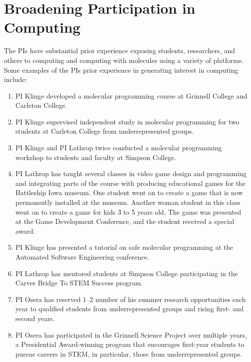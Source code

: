 \section{Broadening Participation in Computing}

The PIs have substantial prior experience exposing students, researchers, and others to computing and computing with molecules using a variety of platforms.  Some examples of the PIs prior experience in generating interest in computing include:
\begin{enumerate}
    \item PI Klinge developed a molecular programming course at Grinnell College and Carleton College.
    \item PI Klinge supervised independent study in molecular programming for two students at Carleton College from underrepresented groups.
    \item PI Klinge and PI Lathrop twice conducted a molecular programming workshop to students and faculty at Simpson College.
    \item PI Lathrop has taught several classes in video game design and programming and integrating parts of the course with producing educational games for the Battleship Iowa museum. One student went on to create a game that is now permanently installed at the museum.  Another woman student in this class went on to create a game for kids 3 to 5 years old.  The game was presented at the Game Development Conference, and the student received a special award.
    \item PI Klinge has presented a tutorial on safe molecular programming at the Automated Software Engineering conference.
    \item PI Lathrop has mentored students at Simpson College participating in the Carver Bridge To STEM Success program.
  \item PI Osera has reserved 1--2 number of his summer research opportunities each year to qualified students from underrepresented groups and rising first- and second years.
  \item PI Osera has participated in the Grinnell Science Project over multiple years, a Presidential Award-winning program that encourages first-year students to pursue careers in STEM, in particular, those from underrepresented groups.
\end{enumerate}

